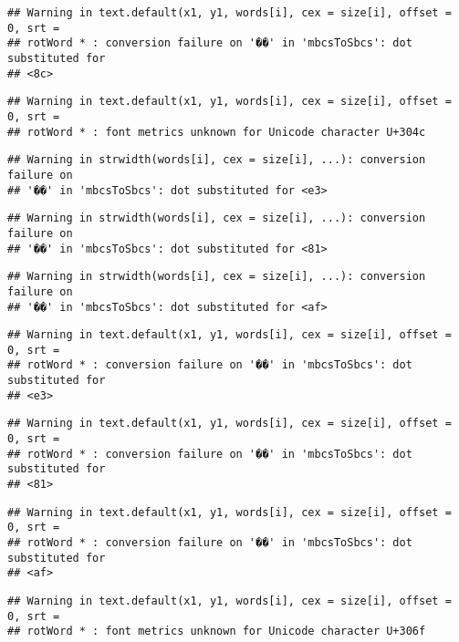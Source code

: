 \documentclass[]{article}
\begin{document}
\begin{verbatim}
## Warning in text.default(x1, y1, words[i], cex = size[i], offset = 0, srt =
## rotWord * : conversion failure on '��' in 'mbcsToSbcs': dot substituted for
## <8c>
\end{verbatim}

\begin{verbatim}
## Warning in text.default(x1, y1, words[i], cex = size[i], offset = 0, srt =
## rotWord * : font metrics unknown for Unicode character U+304c
\end{verbatim}

\begin{verbatim}
## Warning in strwidth(words[i], cex = size[i], ...): conversion failure on
## '��' in 'mbcsToSbcs': dot substituted for <e3>
\end{verbatim}

\begin{verbatim}
## Warning in strwidth(words[i], cex = size[i], ...): conversion failure on
## '��' in 'mbcsToSbcs': dot substituted for <81>
\end{verbatim}

\begin{verbatim}
## Warning in strwidth(words[i], cex = size[i], ...): conversion failure on
## '��' in 'mbcsToSbcs': dot substituted for <af>
\end{verbatim}

\begin{verbatim}
## Warning in text.default(x1, y1, words[i], cex = size[i], offset = 0, srt =
## rotWord * : conversion failure on '��' in 'mbcsToSbcs': dot substituted for
## <e3>
\end{verbatim}

\begin{verbatim}
## Warning in text.default(x1, y1, words[i], cex = size[i], offset = 0, srt =
## rotWord * : conversion failure on '��' in 'mbcsToSbcs': dot substituted for
## <81>
\end{verbatim}

\begin{verbatim}
## Warning in text.default(x1, y1, words[i], cex = size[i], offset = 0, srt =
## rotWord * : conversion failure on '��' in 'mbcsToSbcs': dot substituted for
## <af>
\end{verbatim}

\begin{verbatim}
## Warning in text.default(x1, y1, words[i], cex = size[i], offset = 0, srt =
## rotWord * : font metrics unknown for Unicode character U+306f
\end{verbatim}
\end{document}
